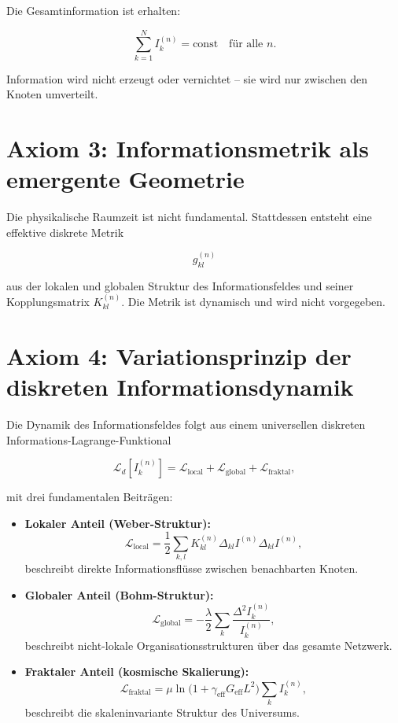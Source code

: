 Die Gesamtinformation ist erhalten:

\[
\sum_{k=1}^{N} I_k^{(n)} = \text{const} \quad \text{für alle } n.
\]

Information wird nicht erzeugt oder vernichtet – sie wird nur zwischen den Knoten umverteilt.

\section{Axiom 3: Informationsmetrik als emergente Geometrie}
\label{sec:axiom3}

Die physikalische Raumzeit ist nicht fundamental. Stattdessen entsteht eine effektive diskrete Metrik

\[
g_{kl}^{(n)}
\]

aus der lokalen und globalen Struktur des Informationsfeldes und seiner Kopplungsmatrix \( K_{kl}^{(n)} \). Die Metrik ist dynamisch und wird nicht vorgegeben.

\section{Axiom 4: Variationsprinzip der diskreten Informationsdynamik}
\label{sec:axiom4}

Die Dynamik des Informationsfeldes folgt aus einem universellen diskreten Informations-Lagrange-Funktional

\[
\mathcal{L}_d[I_k^{(n)}] = \mathcal{L}_{\text{local}} + \mathcal{L}_{\text{global}} + \mathcal{L}_{\text{fraktal}},
\]

mit drei fundamentalen Beiträgen:

\begin{itemize}
    \item \textbf{Lokaler Anteil (Weber-Struktur):}  
    \[
    \mathcal{L}_{\text{local}} = \frac{1}{2} \sum_{k,l} K_{kl}^{(n)} \Delta_{kl} I^{(n)} \Delta_{kl} I^{(n)},
    \]
    beschreibt direkte Informationsflüsse zwischen benachbarten Knoten.

    \item \textbf{Globaler Anteil (Bohm-Struktur):}  
    \[
    \mathcal{L}_{\text{global}} = -\frac{\lambda}{2} \sum_k \frac{\Delta^2 I_k^{(n)}}{I_k^{(n)}},
    \]
    beschreibt nicht-lokale Organisationsstrukturen über das gesamte Netzwerk.

    \item \textbf{Fraktaler Anteil (kosmische Skalierung):}  
    \[
    \mathcal{L}_{\text{fraktal}} = \mu \ln\!\bigl(1 + \gamma_{\text{eff}} G_{\text{eff}} L^2\bigr) \sum_k I_k^{(n)},
    \]
    beschreibt die skaleninvariante Struktur des Universums.
\end{itemize}

